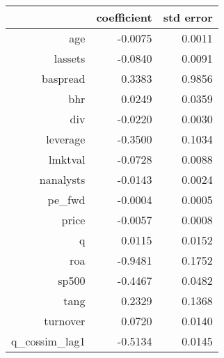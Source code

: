 \begin{table}[ht]
\centering
\begin{tabular}{rrr}
  \hline
 & coefficient & std error \\ 
  \hline
age & -0.0075 & 0.0011 \\ 
  lassets & -0.0840 & 0.0091 \\ 
  baspread & 0.3383 & 0.9856 \\ 
  bhr & 0.0249 & 0.0359 \\ 
  div & -0.0220 & 0.0030 \\ 
  leverage & -0.3500 & 0.1034 \\ 
  lmktval & -0.0728 & 0.0088 \\ 
  nanalysts & -0.0143 & 0.0024 \\ 
  pe\_fwd & -0.0004 & 0.0005 \\ 
  price & -0.0057 & 0.0008 \\ 
  q & 0.0115 & 0.0152 \\ 
  roa & -0.9481 & 0.1752 \\ 
  sp500 & -0.4467 & 0.0482 \\ 
  tang & 0.2329 & 0.1368 \\ 
  turnover & 0.0720 & 0.0140 \\ 
  q\_cossim\_lag1 & -0.5134 & 0.0145 \\ 
   \hline
\end{tabular}
\end{table}
